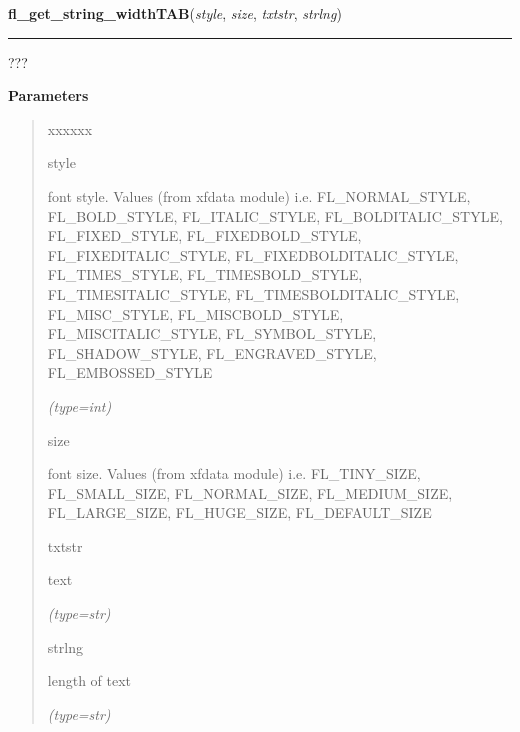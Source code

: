 \hspace{.8\funcindent}\begin{boxedminipage}{\funcwidth}

    \raggedright \textbf{fl\_get\_string\_widthTAB}(\textit{style}, \textit{size}, \textit{txtstr}, \textit{strlng})

    \vspace{-1.5ex}

    \rule{\textwidth}{0.5\fboxrule}
\setlength{\parskip}{2ex}
    ???

\setlength{\parskip}{1ex}
      \textbf{Parameters}
      \vspace{-1ex}

      \begin{quote}
        \begin{Ventry}{xxxxxx}

          \item[style]

          font style. Values (from xfdata module) i.e. FL\_NORMAL\_STYLE, 
          FL\_BOLD\_STYLE, FL\_ITALIC\_STYLE, FL\_BOLDITALIC\_STYLE, 
          FL\_FIXED\_STYLE, FL\_FIXEDBOLD\_STYLE, FL\_FIXEDITALIC\_STYLE, 
          FL\_FIXEDBOLDITALIC\_STYLE, FL\_TIMES\_STYLE, 
          FL\_TIMESBOLD\_STYLE, FL\_TIMESITALIC\_STYLE, 
          FL\_TIMESBOLDITALIC\_STYLE, FL\_MISC\_STYLE, FL\_MISCBOLD\_STYLE,
          FL\_MISCITALIC\_STYLE, FL\_SYMBOL\_STYLE, FL\_SHADOW\_STYLE, 
          FL\_ENGRAVED\_STYLE, FL\_EMBOSSED\_STYLE

            {\it (type=int)}

          \item[size]

          font size. Values (from xfdata module) i.e. FL\_TINY\_SIZE, 
          FL\_SMALL\_SIZE, FL\_NORMAL\_SIZE, FL\_MEDIUM\_SIZE, 
          FL\_LARGE\_SIZE, FL\_HUGE\_SIZE, FL\_DEFAULT\_SIZE

          \item[txtstr]

          text

            {\it (type=str)}

          \item[strlng]

          length of text

            {\it (type=str)}

        \end{Ventry}

      \end{quote}


\end{boxedminipage}
